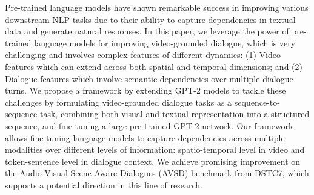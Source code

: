 Pre-trained language models have shown remarkable success in improving various downstream NLP tasks due to their ability to capture dependencies in textual data and generate natural responses. In this paper, we leverage the power of pre-trained language models for improving video-grounded dialogue, which is very challenging and involves complex features of different dynamics: (1) Video features which can extend across both spatial and temporal dimensions; and (2) Dialogue features which involve semantic dependencies over multiple dialogue turns. We propose a framework by extending GPT-2 models to tackle these challenges by formulating video-grounded dialogue tasks as a sequence-to-sequence task, combining both visual and textual representation into a structured sequence, and fine-tuning a large pre-trained GPT-2 network. Our framework allows fine-tuning language models to capture dependencies across multiple modalities over different levels of information: spatio-temporal level in video and token-sentence level in dialogue context. We achieve promising improvement on the Audio-Visual Scene-Aware Dialogues (AVSD) benchmark from DSTC7, which supports a potential direction in this line of research.
